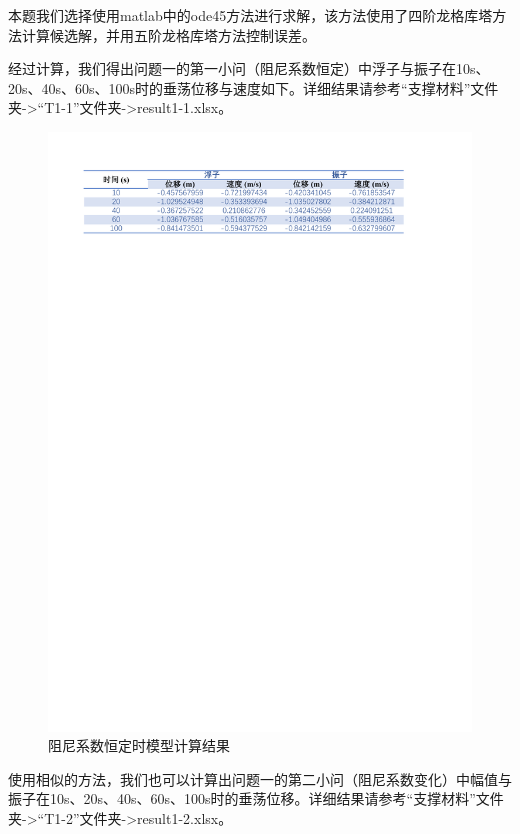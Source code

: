 \documentclass[12pt,utf8]{article}
\begin{document}
本题我们选择使用matlab中的ode45方法进行求解，该方法使用了四阶龙格库塔方法计算候选解，并用五阶龙格库塔方法控制误差。

经过计算，我们得出问题一的第一小问（阻尼系数恒定）中浮子与振子在10s、20s、40s、60s、100s时的垂荡位移与速度如下。详细结果请参考“支撑材料”文件夹->“T1-1”文件夹->result1-1.xlsx。

\begin{figure}[h]
	\centering
	\includegraphics[width=0.7\linewidth]{figures/result1-1}
	\caption[]{阻尼系数恒定时模型计算结果}
	\label{fig:result1-1}
\end{figure}

使用相似的方法，我们也可以计算出问题一的第二小问（阻尼系数变化）中幅值与振子在10s、20s、40s、60s、100s时的垂荡位移。详细结果请参考“支撑材料”文件夹->“T1-2”文件夹->result1-2.xlsx。
\end{document}
